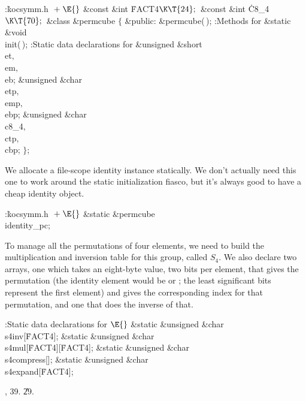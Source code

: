 \Y\B\4:\.{kocsymm.h }\X${}\mathrel+\E{}$\6
\&{const} \&{int} \.{FACT4}${}\K\T{24};{}$\6
\&{const} \&{int} \.{C8\_4}${}\K\T{70};{}$\6
\&{class} \&{permcube} ${}\{{}$\1\6
\4\&{public}:\6
\&{permcube}(\,);\6
:Methods for \X\7
\&{static} \&{void} \\{init}(\,);\7
:Static data declarations for \X\7
\&{unsigned} \&{short} \\{et}${},{}$ \\{em}${},{}$ \\{eb};\6
\&{unsigned} \&{char} \\{etp}${},{}$ \\{emp}${},{}$ \\{ebp};\6
\&{unsigned} \&{char} \\{c8\_4}${},{}$ \\{ctp}${},{}$ \\{cbp};\2\6
${}\}{}$;\par
\fi

We allocate a file-scope identity instance statically.  We don't
actually need this one to work around the static initialization
fiasco, but it's always good to have a cheap identity object.

\Y\B\4:\.{kocsymm.h }\X${}\mathrel+\E{}$\6
\&{static} \&{permcube} \\{identity\_pc};\par
\fi

To manage all the permutations of four elements, we need to build
the multiplication and inversion table for this group, called $S_4$.
We also declare two arrays, one which takes an eight-byte value, two
bits per element, that gives the permutation (the identity element
would be  or ; the least significant bits
represent
the first element) and gives the corresponding index for that
permutation, and one that does the inverse of that.

\Y\B\4:Static data declarations for \X${}\E{}$\6
\&{static} \&{unsigned} \&{char} \\{s4inv}[\.{FACT4}];\6
\&{static} \&{unsigned} \&{char} \\{s4mul}[\.{FACT4}][\.{FACT4}];\6
\&{static} \&{unsigned} \&{char} \\{s4compress}[];\6
\&{static} \&{unsigned} \&{char} \\{s4expand}[\.{FACT4}];\par
{}, 39.
\U29.\fi

